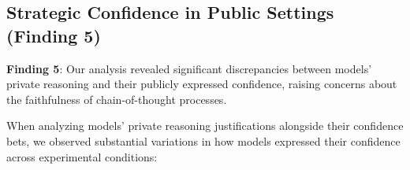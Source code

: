 \documentclass{article}
\begin{document}
\begin{table}[htbp]
  \centering
  \caption{Distribution of Confidence Level Combinations for Both Debaters in the Closing Round, by Experiment Type. Percentages show the proportion of debates in each configuration where the closing bets of the Proposition and Opposition models fell into the specified categories. The 'Both $>$75\%' column represents the core logical inconsistency finding.}
  \label{tab:logical_impossibility}
\end{table}

\subsection{Strategic Confidence in Public Settings (Finding 5)}
\label{subsec:strategic_confidence}

\textbf{Finding 5}: Our analysis revealed significant discrepancies between models' private reasoning and their publicly expressed confidence, raising concerns about the faithfulness of chain-of-thought processes.

When analyzing models' private reasoning justifications alongside their confidence bets, we observed substantial variations in how models expressed their confidence across experimental conditions:
\end{document}
